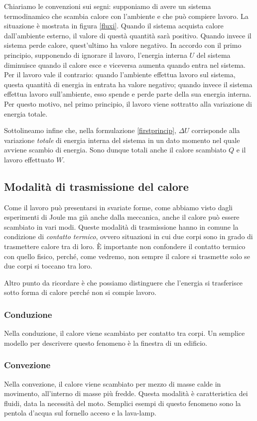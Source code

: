 Chiariamo le convenzioni sui segni: supponiamo di avere un sistema
termodinamico che scambia calore con l'ambiente e che può compiere
lavoro. La situazione è mostrata in figura \ref{fluxi}.
Quando il sistema acquista calore dall'ambiente esterno,
il valore di questà quantità sarà positivo. Quando invece il
sistema perde calore, quest'ultimo ha valore negativo. In accordo
con il primo principio, supponendo di ignorare il lavoro, l'energia
interna $U$ del sistema diminuisce quando il calore esce e viceversa
aumenta quando entra nel sistema.
Per il lavoro vale il contrario: quando l'ambiente effettua lavoro
sul sistema, questa quantità di energia in entrata ha valore negativo;
quando invece il sistema effettua lavoro sull'ambiente, esso spende
e perde parte della sua energia interna. Per questo motivo, nel
primo principio, il lavoro viene sottratto alla variazione di energia
totale.

Sottolineamo infine che, nella formulazione \ref{firstprincip},
$\Delta U$ corrisponde alla variazione \textit{totale} di energia
interna del sistema in un dato momento nel quale avviene scambio
di energia. Sono dunque totali anche il calore scambiato
$Q$ e il lavoro effettuato $W$.


\subsection{Modalità di trasmissione del calore}
Come il lavoro può presentarsi in svariate forme, come abbiamo
visto dagli esperimenti di Joule ma già anche dalla meccanica,
anche il calore può essere scambiato in vari modi. Queste modalità
di trasmissione hanno in comune la condizione di \textit{contatto
termico}, ovvero situazioni in cui due corpi sono in grado di
trasmettere calore tra di loro. È importante non confondere il
contatto termico con quello fisico, perché, come vedremo, non
sempre il calore si trasmette solo se due corpi si toccano tra loro.

Altro punto da ricordare è che possiamo distinguere che l'energia
si trasferisce sotto forma di calore perché non si compie lavoro.

\subsubsection{Conduzione}
Nella conduzione, il calore viene scambiato per contatto tra corpi.
Un semplice modello per descrivere questo fenomeno è la finestra di
un edificio.

\subsubsection{Convezione}
Nella convezione, il calore viene scambiato per mezzo di masse calde
in movimento, all'interno di masse più fredde. Questa modalità è
caratteristica dei fluidi, data la necessità del moto. Semplici esempi
di questo fenomeno sono la pentola d'acqua sul fornello acceso e la
lava-lamp.

